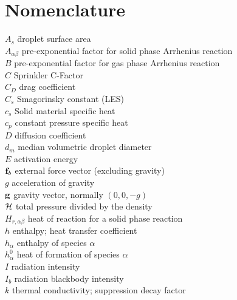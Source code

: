 \chapter{Nomenclature}
\label{nomenclature}

\begin{tabbing}
$A_s$ \hspace{1in}        \= droplet surface area \\
$A_{\alpha\beta}$          \> pre-exponential factor for solid phase Arrhenius reaction \\
$B$                       \> pre-exponential factor for gas phase Arrhenius reaction \\
$C$                       \> Sprinkler C-Factor \\
$C_D$                     \> drag coefficient \\
$C_s$                     \> Smagorinsky constant (LES)  \\
$c_s$             \> Solid material specific heat \\
$c_p$                     \> constant pressure specific heat \\
$D$                       \> diffusion coefficient   \\
$d_m$                     \> median volumetric droplet diameter \\
$E$                       \> activation energy \\
${\bf f}_b$                  \> external force vector (excluding gravity) \\
$g$                       \> acceleration of gravity \\
${\bf g}$                     \> gravity vector, normally $(0,0,-g)$ \\
$\cal H$                  \> total pressure divided by the density \\
$H_{r,\alpha\beta}$   \> heat of reaction for a solid phase reaction \\
$h$                       \> enthalpy; heat transfer coefficient   \\
$h_\alpha$                \> enthalpy of species $\alpha$   \\
$h_\alpha^0$              \> heat of formation of species $\alpha$   \\
$I$                       \> radiation intensity   \\
$I_b$                     \> radiation blackbody intensity   \\
$k$                       \> thermal conductivity; suppression decay factor \\

\end{tabbing}
